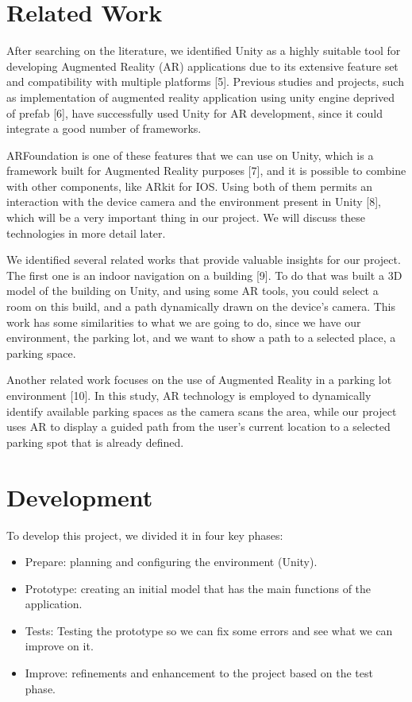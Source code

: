 \documentclass[11pt]{article}
\begin{document}
\begin{multicols}{2}
    \section{Related Work}
    After searching on the literature, we identified Unity as a highly suitable tool for developing Augmented Reality (AR) applications due to its extensive feature set and compatibility with multiple platforms [5]. Previous studies and projects, such as implementation of augmented reality application using unity engine deprived of prefab [6], have successfully used Unity for AR development, since it could integrate a good number of frameworks.

	ARFoundation is one of these features that we can use on Unity, which is a framework built for Augmented Reality purposes [7], and it is possible to combine with other components, like ARkit for IOS. Using both of them permits an interaction with the device camera and the environment present in Unity [8], which will be a very important thing in our project. We will discuss these technologies in more detail later.

	We identified several related works that provide valuable insights for our project. The first one is an indoor navigation on a building [9]. To do that was built a 3D model of the building on Unity, and using some AR tools, you could select a room on this build, and a path dynamically drawn on the device's camera. This work has some similarities to what we are going to do, since we have our environment, the parking lot, and we want to show a path to a selected place, a parking space.

	Another related work focuses on the use of Augmented Reality in a parking lot environment [10]. In this study, AR technology is employed to dynamically identify available parking spaces as the camera scans the area, while our project uses AR to display a guided path from the user’s current location to a selected parking spot that is already defined.

    \section{Development}
    To develop this project, we divided it in four key phases:
    \begin{itemize}
		\item Prepare: planning and configuring the environment (Unity).
		\item Prototype: creating an initial model that has the main functions of the application.
		\item Tests: Testing the prototype so we can fix some errors and see what we can improve on it.
		\item Improve: refinements and enhancement to the project based on the test phase.
    \end{itemize}


\end{multicols}
\end{document}
